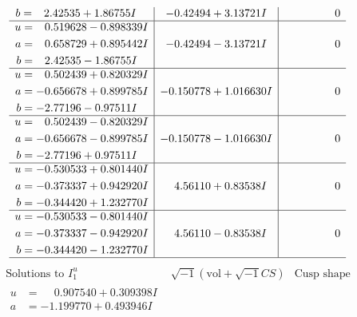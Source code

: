 \documentclass[1p]{elsarticle_modified}
\theoremstyle{definition}
\newcommand{\I}{\sqrt{-1}}
\begin{document}
$$\begin{array}{c|c|c}
\begin{aligned}
b &= \phantom{-}2.42535 + 1.86755 I\end{aligned}
 & -0.42494 + 3.13721 I & \phantom{-0.000000 } 0 \\ \hline\begin{aligned}
u &= \phantom{-}0.519628 - 0.898339 I \\
a &= \phantom{-}0.658729 + 0.895442 I \\
b &= \phantom{-}2.42535 - 1.86755 I\end{aligned}
 & -0.42494 - 3.13721 I & \phantom{-0.000000 } 0 \\ \hline\begin{aligned}
u &= \phantom{-}0.502439 + 0.820329 I \\
a &= -0.656678 + 0.899785 I \\
b &= -2.77196 - 0.97511 I\end{aligned}
 & -0.150778 + 1.016630 I & \phantom{-0.000000 } 0 \\ \hline\begin{aligned}
u &= \phantom{-}0.502439 - 0.820329 I \\
a &= -0.656678 - 0.899785 I \\
b &= -2.77196 + 0.97511 I\end{aligned}
 & -0.150778 - 1.016630 I & \phantom{-0.000000 } 0 \\ \hline\begin{aligned}
u &= -0.530533 + 0.801440 I \\
a &= -0.373337 + 0.942920 I \\
b &= -0.344420 + 1.232770 I\end{aligned}
 & \phantom{-}4.56110 + 0.83538 I & \phantom{-0.000000 } 0 \\ \hline\begin{aligned}
u &= -0.530533 - 0.801440 I \\
a &= -0.373337 - 0.942920 I \\
b &= -0.344420 - 1.232770 I\end{aligned}
 & \phantom{-}4.56110 - 0.83538 I & \phantom{-0.000000 } 0\\
 \hline 
 \end{array}$$\newpage$$\begin{array}{c|c|c}  
\text{Solutions to }I^u_{1}& \I (\text{vol} + \sqrt{-1}CS) & \text{Cusp shape}\\
 \hline 
\begin{aligned}
u &= \phantom{-}0.907540 + 0.309398 I \\
a &= -1.199770 + 0.493946 I \\

\end{aligned}
\end{array}$$
\end{document}
